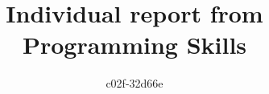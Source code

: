 \documentclass[11pt,a4paper]{article}
\begin{document}
\title{Individual report from Programming Skills}
\author{c02f-32d66e}
\maketitle
\end{document}
